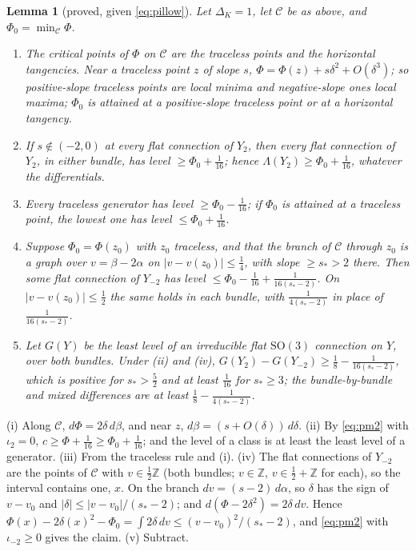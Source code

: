 \documentclass[10pt]{amsart}
\makeatletter
\numberwithin{equation}{section}
\theoremstyle{compact}
\newtheorem{lemma}[theorem]{Lemma}
\theoremstyle{definition}
\renewenvironment{proof}[1][\proofname]{\par\pushQED{\qed}\normalfont
  \topsep4\p@\relax\trivlist\item[\hskip\labelsep\itshape#1\@addpunct{.}]%
  \ignorespaces}{\popQED\endtrivlist\@endpefalse}
\newcommand{\Z}{\mathbb Z}
\newcommand{\SO}{\mathrm{SO}}
\newcommand{\cC}{\mathcal C}
\makeatother
\begin{document}
\begin{lemma}[proved, given \eqref{eq:pillow}]\label{lem:steep}
Let $\Delta_K=1$, let $\cC$ be as above, and $\Phi_0=\min_\cC\Phi$.
\begin{enumerate}
\item[(i)] The critical points of $\Phi$ on $\cC$ are the traceless points
and the horizontal tangencies. Near a traceless point $z$ of slope $s$,
$\Phi=\Phi(z)+s\delta^2+O(\delta^3)$; so positive-slope traceless points are
local minima and negative-slope ones local maxima; $\Phi_0$ is attained at
a positive-slope traceless point or at a horizontal tangency.
\item[(ii)] If $s\notin(-2,0)$ at every flat connection of $Y_2$, then every
flat connection of $Y_2$, in either bundle, has level $\ge\Phi_0+\frac1{16}$;
hence $\Lambda(Y_2)\ge\Phi_0+\frac1{16}$, whatever the differentials.
\item[(iii)] Every traceless generator has level $\ge\Phi_0-\frac1{16}$; if
$\Phi_0$ is attained at a traceless point, the lowest one has level
$\le\Phi_0+\frac1{16}$.
\item[(iv)] Suppose $\Phi_0=\Phi(z_0)$ with $z_0$ traceless, and that the
branch of $\cC$ through $z_0$ is a graph over $v=\beta-2\alpha$ on
$|v-v(z_0)|\le\frac14$, with slope $\ge s_*>2$ there. Then some flat
connection of $Y_{-2}$ has level $\le\Phi_0-\frac1{16}+\frac1{16(s_*-2)}$. On
$|v-v(z_0)|\le\frac12$ the same holds in each bundle, with
$\frac1{4(s_*-2)}$ in place of $\frac1{16(s_*-2)}$.
\item[(v)] Let $G(Y)$ be the least level of an irreducible flat
$\SO(3)$ connection on $Y$, over both bundles. Under (ii) and (iv),
$G(Y_2)-G(Y_{-2})\ge\frac18-\frac1{16(s_*-2)}$, which is positive for
$s_*>\frac52$ and at least $\frac1{16}$ for $s_*\ge3$; the bundle-by-bundle
and mixed differences are at least $\frac18-\frac1{4(s_*-2)}$.
\end{enumerate}
\end{lemma}

\begin{proof}
(i) Along $\cC$, $d\Phi=2\delta\,d\beta$, and near $z$,
$d\beta=(s+O(\delta))\,d\delta$. (ii) By \eqref{eq:pm2} with $\iota_2=0$,
$c\ge\Phi+\frac1{16}\ge\Phi_0+\frac1{16}$; and the level of a class is at
least the least level of a generator. (iii) From the
traceless rule and (i). (iv) The flat connections of $Y_{-2}$ are the points
of $\cC$ with $v\in\frac12\Z$ (both bundles; $v\in\Z$, $v\in\frac12+\Z$ for
each), so the interval contains one, $x$. On the branch $dv=(s-2)\,d\alpha$,
so $\delta$ has the sign of $v-v_0$ and $|\delta|\le|v-v_0|/(s_*-2)$; and
$d(\Phi-2\delta^2)=2\delta\,dv$. Hence
$\Phi(x)-2\delta(x)^2-\Phi_0=\int2\delta\,dv\le(v-v_0)^2/(s_*-2)$, and
\eqref{eq:pm2} with $\iota_{-2}\ge0$ gives the claim. (v) Subtract.
\end{proof}
\end{document}

